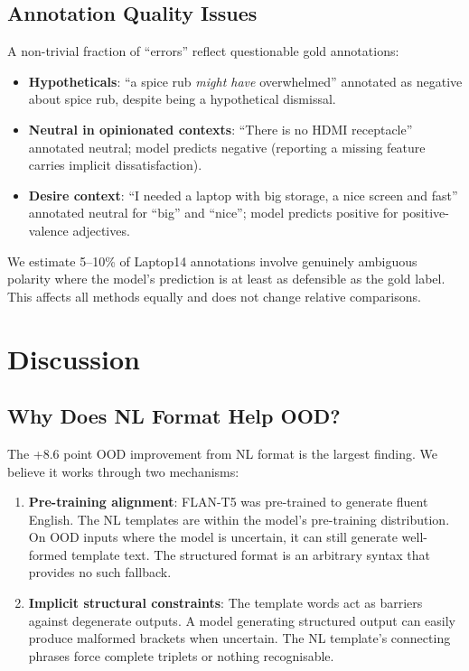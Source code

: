 \documentclass[12pt,a4paper]{report}
\begin{document}
\subsection{Annotation Quality Issues}

A non-trivial fraction of ``errors'' reflect questionable gold annotations:

\begin{itemize}
    \item \textbf{Hypotheticals}: ``a spice rub \textit{might have} overwhelmed'' annotated as negative about spice rub, despite being a hypothetical dismissal.
    \item \textbf{Neutral in opinionated contexts}: ``There is no HDMI receptacle'' annotated neutral; model predicts negative (reporting a missing feature carries implicit dissatisfaction).
    \item \textbf{Desire context}: ``I needed a laptop with big storage, a nice screen and fast'' annotated neutral for ``big'' and ``nice''; model predicts positive for positive-valence adjectives.
\end{itemize}

We estimate 5--10\% of Laptop14 annotations involve genuinely ambiguous polarity where the model's prediction is at least as defensible as the gold label. This affects all methods equally and does not change relative comparisons.


\section{Discussion}

\subsection{Why Does NL Format Help OOD?}

The +8.6 point OOD improvement from NL format is the largest finding. We believe it works through two mechanisms:

\begin{enumerate}
    \item \textbf{Pre-training alignment}: FLAN-T5 was pre-trained to generate fluent English. The NL templates are within the model's pre-training distribution. On OOD inputs where the model is uncertain, it can still generate well-formed template text. The structured format is an arbitrary syntax that provides no such fallback.
    
    \item \textbf{Implicit structural constraints}: The template words act as barriers against degenerate outputs. A model generating structured output can easily produce malformed brackets when uncertain. The NL template's connecting phrases force complete triplets or nothing recognisable.
\end{enumerate}
\end{document}
